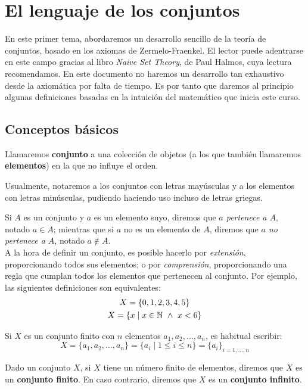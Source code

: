 \chapter{El lenguaje de los conjuntos}
En este primer tema, abordaremos un desarrollo sencillo de la teoría de conjuntos, basado en los axiomas de Zermelo-Fraenkel. El lector puede adentrarse en este campo gracias al libro \emph{Naive Set Theory}, de Paul Halmos, cuya lectura recomendamos. En este documento no haremos un desarrollo tan exhaustivo desde la axiomática por falta de tiempo. Es por tanto que daremos al principio algunas definiciones basadas en la intuición del matemático que inicia este curso.

\section{Conceptos básicos}

\begin{definicion}[Conjunto]
    Llamaremos \textbf{conjunto} a una colección de objetos (a los que también llamaremos \textbf{elementos})
    en la que no influye el orden.
\end{definicion}
\begin{notacion}
    Usualmente, notaremos a los conjuntos con letras mayúsculas y a los elementos con letras minúsculas, pudiendo haciendo uso incluso de letras griegas.
\end{notacion}

Si $A$ es un conjunto y $a$ es un elemento suyo, diremos que \textit{$a$ pertenece a $A$}, notado $a \in A$; mientras que si $a$ no es un elemento de $A$, diremos que \textit{$a$ no pertenece a $A$}, notado $a \notin A$.\\

A la hora de definir un conjunto, es posible hacerlo por \textit{extensión}, proporcionando todos sus elementos; o por \textit{comprensión}, proporcionando una regla que cumplan todos los elementos que pertenecen al conjunto. Por ejemplo, las siguientes definiciones son equivalentes:
\begin{gather*}
    X = \{0, 1, 2, 3, 4, 5\} \\
    X = \{x \mid x \in \mathbb N \ \land \  x < 6\}
\end{gather*}

Si $X$ es un conjunto finito con $n$ elementos $a_1, a_2, \ldots, a_n$, es habitual escribir: $$X = \{a_1, a_2, \ldots, a_n\} = \{a_i \mid 1 \leq i \leq n\} = \{a_i\}_{i = 1, \ldots, n}$$

\begin{definicion}
    Dado un conjunto $X$, si $X$ tiene un número finito de elementos, diremos que $X$ es un \textbf{conjunto finito}. En caso contrario, diremos que $X$ es un \textbf{conjunto infinito}.
\end{definicion}

